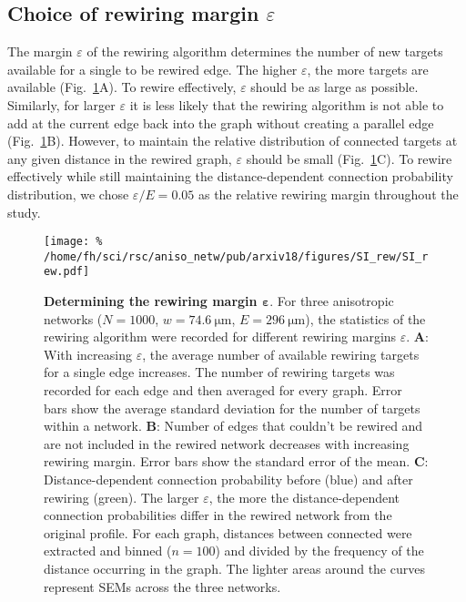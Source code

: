 
\subsection{Choice of rewiring margin $\varepsilon$}
\label{sec:rewiring_margin}

The margin $\varepsilon$ of the rewiring algorithm determines the
number of new targets available for a single to be rewired edge. The
higher $\varepsilon$, the more targets are available
(Fig.~\ref{fig:rew-ddcp-ef}A). To rewire effectively, $\varepsilon$
should be as large as possible. Similarly, for larger $\varepsilon$ it
is less likely that the rewiring algorithm is not able to add at
the current edge back into the graph without creating a parallel edge
(Fig.~\ref{fig:rew-ddcp-ef}B). However, to maintain the relative
distribution of connected targets at any given distance in the rewired
graph, $\varepsilon$ should be small (Fig.~\ref{fig:rew-ddcp-ef}C). To
rewire effectively while still maintaining the distance-dependent
connection probability distribution, we chose $\varepsilon/E = 0.05$
as the relative rewiring margin throughout the study. 

\addtocounter{subsection}{1}
\begin{figure}[h!]
  \texttt{[image: \%
    /home/fh/sci/rsc/aniso\_netw/pub/arxiv18/figures/SI\_rew/SI\_rew.pdf]}
  \caption{\textbf{Determining the rewiring margin
      $\bm{\varepsilon}$}. For three anisotropic networks ($N=1000$,
    $w=\SI{74.6}{\micro\meter}$, $E=\SI{296}{\micro\meter}$), the
    statistics of the rewiring algorithm were recorded for different
    rewiring margins $\varepsilon$.
    \textbf{A}: With increasing $\varepsilon$, the average number of
    available rewiring targets for a single edge increases. The number
    of rewiring targets was recorded for each edge and then averaged
    for every graph. Error bars show the average standard deviation
    for the number of targets within a network.
    \textbf{B}: Number of edges that couldn't be rewired and are not
    included in the rewired network decreases with increasing rewiring
    margin. Error bars show the standard error of the
    mean.
    \textbf{C}: Distance-dependent connection probability before
    (blue) and after rewiring (green). The larger $\varepsilon$, the
    more the distance-dependent connection probabilities differ in the
    rewired network from the original profile. For each graph,
    distances between connected were extracted and binned ($n=100$)
    and divided by the frequency of the distance occurring in the
    graph. The lighter areas around the curves represent SEMs across
    the three networks.}
  \label{fig:rew-ddcp-ef}
  \end{figure}
